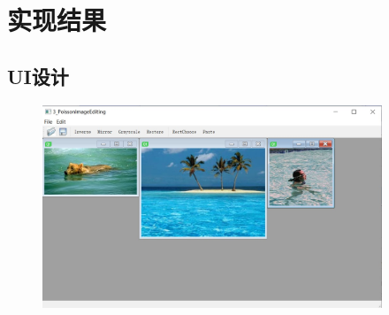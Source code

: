 \documentclass{article}
\begin{document}
	\section{实现结果}
	\subsection{UI设计}
	\begin{figure}[htb]
		\begin{center}
		\includegraphics[width=4in]{ui.jpg}
		\end{center}
	\end{figure}
\end{document}
